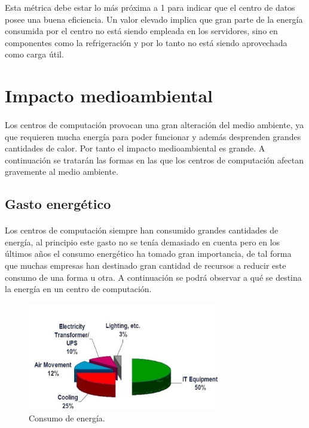 \documentclass[12pt]{article}
\begin{document}
            Esta métrica debe estar lo más próxima a 1 para indicar que el centro de datos posee una buena eficiencia. Un valor elevado implica que gran parte de la energía consumida por el centro no está siendo empleada en los servidores, sino en componentes como la refrigeración y por lo tanto no está siendo aprovechada como carga útil.
            
            \paragraph{}

  \section{Impacto medioambiental}
	\label{sec:impacto}

    \paragraph{}
		Los centros de computación provocan una gran alteración del medio ambiente, ya que requieren mucha energía para poder funcionar y además desprenden grandes cantidades de calor. Por tanto el impacto medioambiental es grande. A continuación se tratarán las formas en las que los centros de computación afectan gravemente al medio ambiente.

    \subsection{Gasto energético}
	  	\paragraph{}
		Los centros de computación siempre han consumido grandes cantidades de energía, al principio este gasto no se tenía demasiado en cuenta pero en los últimos años el consumo energético ha tomado gran importancia, de tal forma que muchas empresas han destinado gran cantidad de recursos a reducir este consumo de una forma u otra. A continuación se podrá observar a qué se destina la energía en un centro de computación. 
        
        \begin{figure}[htpb!]
				\begin{center}
					\includegraphics[width=0.75\textwidth]{tech-consumo}
					\caption{Consumo de energía.\cite{technoreeze: impacto}}
					\label{image:tech-consumo.PNG}
				\end{center}
		\end{figure}
            
\end{document}
